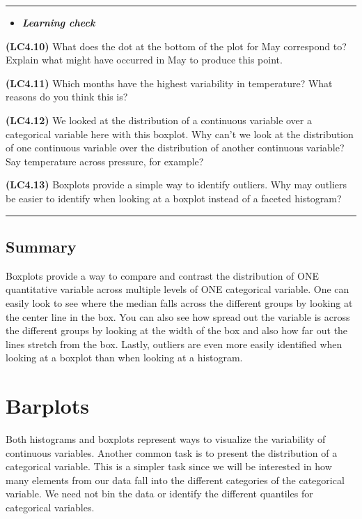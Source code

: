 \documentclass[]{tufte-book}
\let\oldrule=\rule
\renewcommand{\rule}[1]{\oldrule{\linewidth}}
\newenvironment{rmdblock}[1]
  {\begin{shaded*}
  \begin{itemize}
  \renewcommand{\labelitemi}{
    \raisebox{-.7\height}[0pt][0pt]{
    }
  }
  \item
  }
  {
  \end{itemize}
  \end{shaded*}
  }
\newenvironment{learncheck}
  {\begin{rmdblock}{warning}}
  {\end{rmdblock}}
\begin{document}
\begin{center}\rule{0.5\linewidth}{\linethickness}\end{center}

\begin{learncheck}
\textbf{\emph{Learning check}}
\end{learncheck}

\textbf{(LC4.10)} What does the dot at the bottom of the plot for May
correspond to? Explain what might have occurred in May to produce this
point.

\textbf{(LC4.11)} Which months have the highest variability in
temperature? What reasons do you think this is?

\textbf{(LC4.12)} We looked at the distribution of a continuous variable
over a categorical variable here with this boxplot. Why can't we look at
the distribution of one continuous variable over the distribution of
another continuous variable? Say temperature across pressure, for
example?

\textbf{(LC4.13)} Boxplots provide a simple way to identify outliers.
Why may outliers be easier to identify when looking at a boxplot instead
of a faceted histogram?

\begin{center}\rule{0.5\linewidth}{\linethickness}\end{center}

\subsection{Summary}\label{summary-1}

Boxplots provide a way to compare and contrast the distribution of ONE
quantitative variable across multiple levels of ONE categorical
variable. One can easily look to see where the median falls across the
different groups by looking at the center line in the box. You can also
see how spread out the variable is across the different groups by
looking at the width of the box and also how far out the lines stretch
from the box. Lastly, outliers are even more easily identified when
looking at a boxplot than when looking at a histogram.

\section{Barplots}\label{barplots}

Both histograms and boxplots represent ways to visualize the variability
of continuous variables. Another common task is to present the
distribution of a categorical variable. This is a simpler task since we
will be interested in how many elements from our data fall into the
different categories of the categorical variable. We need not bin the
data or identify the different quantiles for categorical variables.
\end{document}
